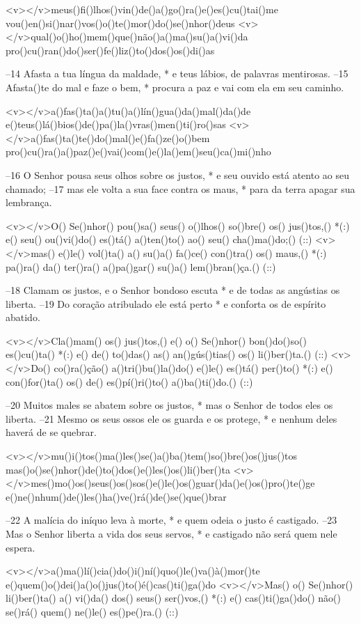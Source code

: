 <v></v>meus()fi()lhos()vin()de()a()go()ra()e()es()cu()tai()me
vou()en()si()nar()vos()o()te()mor()do()se()nhor()deus
<v></v>qual()o()ho()mem()que()não()a()ma()su()a()vi()da
pro()cu()ran()do()ser()fe()liz()to()dos()os()di()as

–14 Afasta a tua língua da maldade, *
e teus lábios, de palavras mentirosas.
–15 Afasta()te do mal e faze o bem, *
procura a paz e vai com ela em seu caminho.

<v></v>a()fas()ta()a()tu()a()lín()gua()da()mal()da()de
e()teus()lá()bios()de()pa()la()vras()men()ti()ro()sas
<v></v>a()fas()ta()te()do()mal()e()fa()ze()o()bem
pro()cu()ra()a()paz()e()vai()com()e()la()em()seu()ca()mi()nho

–16 O Senhor pousa seus olhos sobre os justos, *
e seu ouvido está atento ao seu chamado;
–17 mas ele volta a sua face contra os maus, *
para da terra apagar sua lembrança.

<v></v>O() Se()nhor() pou()sa() seus() o()lhos() so()bre() os() jus()tos,() *(:)
e() seu() ou()vi()do() es()tá() a()ten()to() ao() seu() cha()ma()do;() (::)
<v></v>mas() e()le() vol()ta() a() su()a() fa()ce() con()tra() os() maus,() *(:)
pa()ra() da() ter()ra() a()pa()gar() su()a() lem()bran()ça.() (::)

–18 Clamam os justos, e o Senhor bondoso escuta *
e de todas as angústias os liberta.
–19 Do coração atribulado ele está perto *
e conforta os de espírito abatido.

<v></v>Cla()mam() os() jus()tos,() e() o() Se()nhor() bon()do()so() es()cu()ta() *(:)
e() de() to()das() as() an()gús()tias() os() li()ber()ta.() (::)
<v></v>Do() co()ra()ção() a()tri()bu()la()do() e()le() es()tá() per()to() *(:)
e() con()for()ta() os() de() es()pí()ri()to() a()ba()ti()do.() (::)

–20 Muitos males se abatem sobre os justos, *
mas o Senhor de todos eles os liberta.
–21 Mesmo os seus ossos ele os guarda e os protege, *
e nenhum deles haverá de se quebrar.

<v></v>mu()i()tos()ma()les()se()a()ba()tem()so()bre()os()jus()tos
mas()o()se()nhor()de()to()dos()e()les()os()li()ber()ta
<v></v>mes()mo()os()seus()os()sos()e()le()os()guar()da()e()os()pro()te()ge
e()ne()nhum()de()les()ha()ve()rá()de()se()que()brar

–22 A malícia do iníquo leva à morte, *
e quem odeia o justo é castigado.
–23 Mas o Senhor liberta a vida dos seus servos, *
e castigado não será quem nele espera.

<v></v>a()ma()lí()cia()do()i()ní()quo()le()va()à()mor()te
e()quem()o()dei()a()o()jus()to()é()cas()ti()ga()do
<v></v>Mas() o() Se()nhor() li()ber()ta() a() vi()da() dos() seus() ser()vos,() *(:)
e() cas()ti()ga()do() não() se()rá() quem() ne()le() es()pe()ra.() (::)